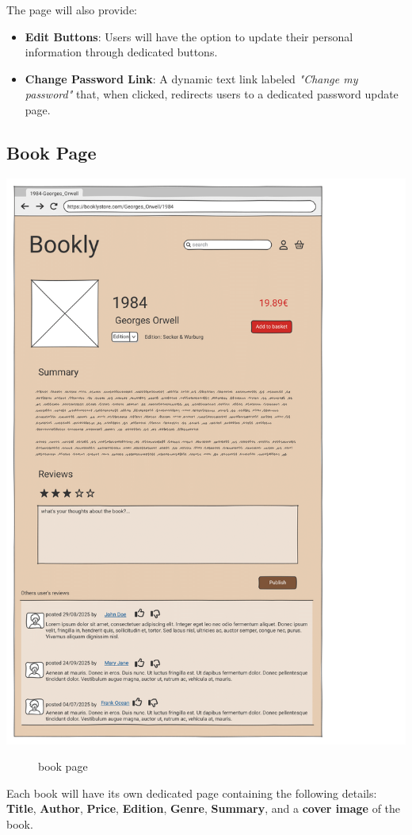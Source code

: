 The page will also provide:
\begin{itemize}
    \item \textbf{Edit Buttons}: Users will have the option to update their personal information through dedicated buttons.
    \item \textbf{Change Password Link}: A dynamic text link labeled \textit{"Change my password"} that, when clicked, redirects users to a dedicated password update page.
\end{itemize}


\subsection{Book Page} \label{sec:book}

\includegraphics[width=0.6\linewidth]{HW1Report/photos/bookpage2.png}

\begin{figure}[h!]
    \centering
    \caption{book page}
    \label{fig:enter-label}
\end{figure}
Each book will have its own dedicated page containing the following details: \textbf{Title}, \textbf{Author}, \textbf{Price}, \textbf{Edition}, \textbf{Genre}, \textbf{Summary}, and a \textbf{cover image} of the book.

